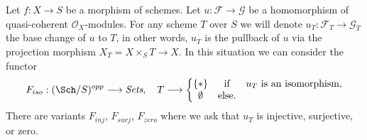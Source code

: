 \begin{situation}
\label{situation-iso}
Let $f : X \to S$ be a morphism of schemes.
Let $u : \mathcal{F} \to \mathcal{G}$ be a homomorphism of
quasi-coherent $\mathcal{O}_X$-modules. For any scheme $T$ over
$S$ we will denote $u_T : \mathcal{F}_T \to \mathcal{G}_T$ the
base change of $u$ to $T$, in other words, $u_T$ is the pullback
of $u$ via the projection morphism $X_T = X \times_S T \to X$.
In this situation we can consider the functor
\begin{equation}
\label{equation-iso}
F_{iso} : (\Sch/S)^{opp} \longrightarrow \textit{Sets}, \quad
T \longrightarrow \left\{
\begin{matrix}
\{*\} & \text{if} & u_T \text{ is an isomorphism}, \\
\emptyset & \text{else.} &
\end{matrix}
\right.
\end{equation}
There are variants $F_{inj}$, $F_{surj}$, $F_{zero}$ where we ask that
$u_T$ is injective, surjective, or zero.
\end{situation}
